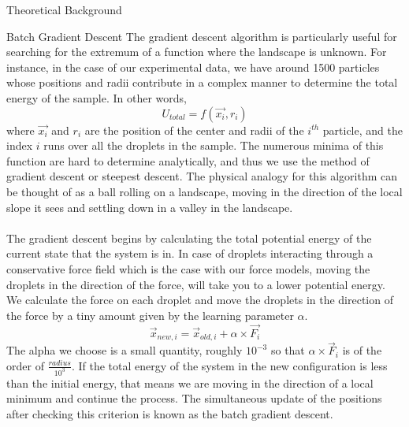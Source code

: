 \documentclass[12pt]{article}
\begin{document}
\newpage
\begin{section}{Theoretical Background}
    
\begin{subsection}{Batch Gradient Descent}
The gradient descent algorithm is particularly useful for searching for the extremum of a function where the landscape is unknown. For instance, in the case of our experimental data, we have around 1500 particles whose positions and radii contribute in a complex manner to determine the total energy of the sample. In other words, \begin{equation}
    U_{total} = f(\Vec{x_i}, r_i) 
\end{equation} where $\Vec{x_i}$ and $r_i$ are the position of the center and radii of the $i^{th}$ particle, and the index $i$ runs over all the droplets in the sample. The numerous minima of this function are hard to determine analytically, and thus we use the method of gradient descent or steepest descent. The physical analogy for this algorithm can be thought of as a ball rolling on a landscape, moving in the direction of the local slope it sees and settling down in a valley in the landscape. 
\\\\ 
The gradient descent begins by calculating the total potential energy of the current state that the system is in. In case of droplets interacting through a conservative force field which is the case with our force models, moving the droplets in the direction of the force, will take you to a lower potential energy. We calculate the force on each droplet and move the droplets in the direction of the force by a tiny amount given by the learning parameter $\alpha$. 
\begin{equation}
    \Vec{x}_{new,i} = \Vec{x}_{old,i} + \alpha \times \Vec{F_i}
\end{equation}
The alpha we choose is a small quantity, roughly $10^{-3}$ so that $\alpha \times \Vec{F}_i$ is of the order of $\frac{radius}{10^3}$. If the total energy of the system in the new configuration is less than the initial energy, that means we are moving in the direction of a local minimum and continue the process. The simultaneous update of the positions after checking this criterion is known as the batch gradient descent.  
\end{subsection}


\end{section}
\end{document}
